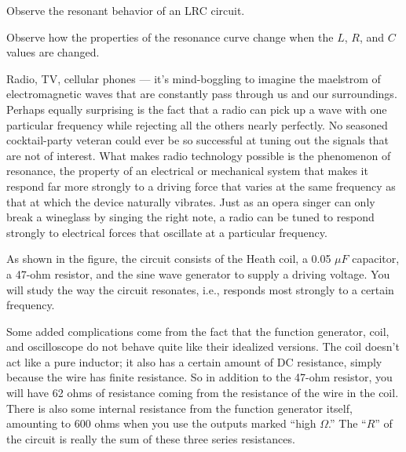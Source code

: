 \label{lab:lrc}

\apparatus
{}

\begin{goals}

\item[] Observe the resonant behavior of an LRC circuit.

\item[] Observe how the properties of the resonance curve change
when the $L$, $R$, and $C$ values are changed.
\end{goals}

\introduction

Radio, TV, cellular phones --- it's mind-boggling to imagine
the maelstrom of electromagnetic waves that are constantly
pass through us and our surroundings. Perhaps equally
surprising is the fact that a radio can pick up a wave with
one particular frequency while rejecting all the others
nearly perfectly. No seasoned cocktail-party veteran could
ever be so successful at tuning out the signals that are not
of interest. What makes radio technology possible is the
phenomenon of resonance, the property of an electrical or
mechanical system that makes it respond far more strongly to
a driving force that varies at the same frequency as that at
which the device naturally vibrates. Just as an opera singer
can only break a wineglass by singing the right note, a
radio can be tuned to respond strongly to electrical forces
that oscillate at a particular frequency.



As shown in the figure, the circuit consists of the
Heath coil, a 0.05 $\mu F$ capacitor,
a 47-ohm resistor, and the sine
wave generator to supply a driving voltage. You will study
the way the circuit resonates, i.e., responds most strongly
to a certain frequency.

Some added complications come from the fact that the function
generator, coil, and oscilloscope do not behave quite like their
idealized versions. The coil doesn't act like a pure inductor; it also
has a certain amount of DC resistance, simply because the wire has finite
resistance. So in addition to the 47-ohm resistor, you will have 62
ohms of resistance coming from the resistance of the wire in
the coil. There is also some internal resistance
from the function generator itself, amounting to 600 ohms when
you use the outputs marked ``high $\Omega$.'' The ``$R$'' of the
circuit is really the sum of these three series resistances.

